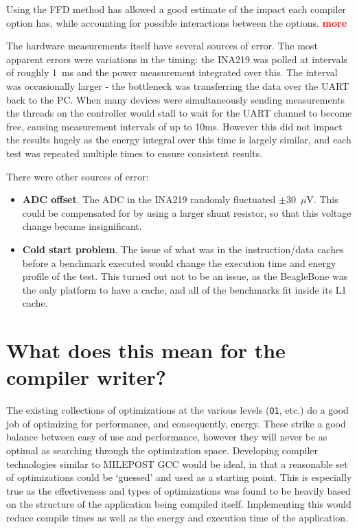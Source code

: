 \documentclass[twocolumn]{article}
\newcommand{\nsection}[1]{\section{\bfseries #1}}
\newcommand{\todo}[1]{\textbf{\textcolor{red}{#1}}}
\begin{document}
Using the FFD method has allowed a good estimate of the impact each compiler option has, while accounting for possible interactions between the options.  \todo{more}

The hardware measurements itself have several sources of error. The most apparent errors were variations in the timing: the INA219 was polled at intervals of roughly 1~ms and the power measurement integrated over this. The interval was occasionally larger - the bottleneck was transferring the data over the UART back to the PC. When many devices were simultaneously sending measurements the threads on the controller would stall to wait for the UART channel to become free, causing measurement intervals of up to 10ms. However this did not impact the results hugely as the energy integral over this time is largely similar, and each test was repeated multiple times to ensure consistent results.

There were other sources of error:
\begin{itemize}
	\item \textbf{ADC offset}. The ADC in the INA219 randomly fluctuated $\pm$30~$\mu$V. This could be compensated for by using a larger shunt resistor, so that this voltage change became insignificant.
	\item \textbf{Cold start problem}. The issue of what was in the instruction/data caches before a benchmark executed would change the execution time and energy profile of the test. This turned out not to be an issue, as the BeagleBone was the only platform to have a cache, and all of the benchmarks fit inside its L1 cache.
\end{itemize}







\nsection{What does this mean for the compiler writer?}

The existing collections of optimizations at the various levels (\texttt{O1}, etc.) do a good job of optimizing for performance, and consequently, energy. These strike a good balance between easy of use and performance, however they will never be as optimal as searching through the optimization space. Developing compiler technologies similar to MILEPOST GCC would be ideal, in that a reasonable set of optimizations could be `guessed' and used as a starting point. This is especially true as the effectiveness and types of optimizations was found to be heavily based on the structure of the application being compiled itself. Implementing this would reduce compile times as well as the energy and execution time of the application.
\end{document}
